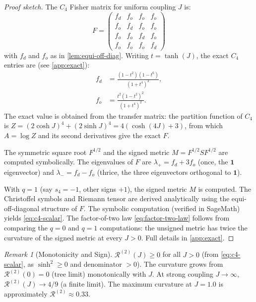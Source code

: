 \documentclass[11pt]{article}
\theoremstyle{definition}
\theoremstyle{remark}
\newtheorem{remark}[theorem]{Remark}
\newcommand{\Fish}{F}
\newcommand{\sgn}{S}
\newcommand{\Met}{M}
\newcommand{\partf}{Z}
\newcommand{\Scal}{\mathcal{R}}
\begin{document}
\begin{proof}[Proof sketch]
The $C_4$ Fisher matrix for uniform coupling $J$ is:
\begin{equation}
  \Fish = \begin{pmatrix}
    f_d & f_o & f_o & f_o \\
    f_o & f_d & f_o & f_o \\
    f_o & f_o & f_d & f_o \\
    f_o & f_o & f_o & f_d
  \end{pmatrix}
  \label{eq:c4-fisher}
\end{equation}
with $f_d$ and $f_o$ as in \cref{lem:equi-off-diag}. Writing $t = \tanh(J)$,
the exact $C_4$ entries are (see \cref{app:exact}):
\begin{align}
  f_d &= \frac{(1 - t^2)(1 - t^6)}{(1 + t^4)^2}, \\
  f_o &= \frac{t^2(1 - t^2)^2}{(1 + t^4)^2}.
  \label{eq:c4-fo-exact}
\end{align}
The exact value is obtained from the transfer matrix: the partition
function of $C_4$ is
$\partf = (2\cosh J)^4 + (2\sinh J)^4 = 4(\cosh(4J) + 3)$, from which
$A = \log \partf$ and its second derivatives give the exact $\Fish$.

The symmetric square root $\Fish^{1/2}$ and the signed metric
$\Met = \Fish^{1/2} \sgn \Fish^{1/2}$ are computed symbolically.
The eigenvalues of $\Fish$ are $\lambda_+ = f_d + 3f_o$ (once,
the $\mathbf{1}$ eigenvector) and $\lambda_- = f_d - f_o$ (thrice,
the three eigenvectors orthogonal to $\mathbf{1}$).

With $q = 1$ (say $s_4 = -1$, other signs $+1$), the signed metric
$\Met$ is computed. The Christoffel symbols and Riemann tensor are
derived analytically using the equi-off-diagonal structure of $\Fish$.
The symbolic computation (verified in SageMath) yields
\eqref{eq:c4-scalar}. The factor-of-two law \eqref{eq:factor-two-law}
follows from comparing the $q = 0$ and $q = 1$ computations: the
unsigned metric has twice the curvature of the signed metric at every
$J > 0$. Full details in \cref{app:exact}.
\end{proof}

\begin{remark}[Monotonicity and Sign]
$\Scal^{(2)}(J) \geq 0$ for all $J > 0$ (from \eqref{eq:c4-scalar}, as $\sinh^2 \geq 0$
and denominator $> 0$). The curvature grows from $\Scal^{(2)}(0) = 0$ (tree
limit) monotonically with $J$. At strong coupling $J \to \infty$,
$\Scal^{(2)}(J) \to 4/9$ (a finite limit). The maximum curvature at $J = 1.0$
is approximately $\Scal^{(2)} \approx 0.33$.
\end{remark}
\end{document}
